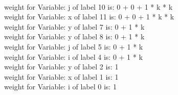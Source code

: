 \begin{example}
                                \\
                                weight for Variable: j of label 10 is: 0 + 0 + 1 * k * k \\
                                weight for Variable: x of label 11 is: 0 + 0 + 1 * k * k \\
                                weight for Variable: y of label 7 is: 0 + 1 * k \\
                                weight for Variable: y of label 8 is: 0 + 1 * k \\
                                weight for Variable: j of label 5 is: 0 + 1 * k \\
                                weight for Variable: i of label 4 is: 0 + 1 * k \\
                                weight for Variable: y of label 2 is: 1 \\
                                weight for Variable: x of label 1 is: 1 \\
                                weight for Variable: i of label 0 is: 1 \\
                                \end{example}


